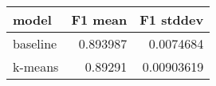 \begin{tabular}{lrr}
\toprule
 model    &   F1 mean &   F1 stddev \\
\midrule
 baseline &  0.893987 &  0.0074684  \\
 k-means  &  0.89291  &  0.00903619 \\
\bottomrule
\end{tabular}